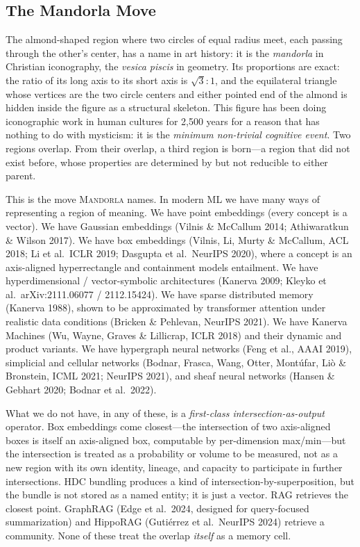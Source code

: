 \documentclass[11pt,a4paper]{article}
\begin{document}
\subsection{The Mandorla Move}

The almond-shaped region where two circles of equal radius meet, each passing through the other's center, has a name in art history: it is the \emph{mandorla} in Christian iconography, the \emph{vesica piscis} in geometry. Its proportions are exact: the ratio of its long axis to its short axis is $\sqrt{3}:1$, and the equilateral triangle whose vertices are the two circle centers and either pointed end of the almond is hidden inside the figure as a structural skeleton. This figure has been doing iconographic work in human cultures for 2,500 years for a reason that has nothing to do with mysticism: it is the \emph{minimum non-trivial cognitive event}. Two regions overlap. From their overlap, a third region is born---a region that did not exist before, whose properties are determined by but not reducible to either parent.

This is the move \textsc{Mandorla} names. In modern ML we have many ways of representing a region of meaning. We have point embeddings (every concept is a vector). We have Gaussian embeddings (Vilnis \& McCallum 2014; Athiwaratkun \& Wilson 2017). We have box embeddings (Vilnis, Li, Murty \& McCallum, ACL 2018; Li et al.\ ICLR 2019; Dasgupta et al.\ NeurIPS 2020), where a concept is an axis-aligned hyperrectangle and containment models entailment. We have hyperdimensional / vector-symbolic architectures (Kanerva 2009; Kleyko et al.\ arXiv:2111.06077 / 2112.15424). We have sparse distributed memory (Kanerva 1988), shown to be approximated by transformer attention under realistic data conditions (Bricken \& Pehlevan, NeurIPS 2021). We have Kanerva Machines (Wu, Wayne, Graves \& Lillicrap, ICLR 2018) and their dynamic and product variants. We have hypergraph neural networks (Feng et al., AAAI 2019), simplicial and cellular networks (Bodnar, Frasca, Wang, Otter, Mont\'ufar, Li\`o \& Bronstein, ICML 2021; NeurIPS 2021), and sheaf neural networks (Hansen \& Gebhart 2020; Bodnar et al.\ 2022).

What we do not have, in any of these, is a \emph{first-class intersection-as-output} operator. Box embeddings come closest---the intersection of two axis-aligned boxes is itself an axis-aligned box, computable by per-dimension max/min---but the intersection is treated as a probability or volume to be measured, not as a new region with its own identity, lineage, and capacity to participate in further intersections. HDC bundling produces a kind of intersection-by-superposition, but the bundle is not stored as a named entity; it is just a vector. RAG retrieves the closest point. GraphRAG (Edge et al.\ 2024, designed for query-focused summarization) and HippoRAG (Guti\'errez et al.\ NeurIPS 2024) retrieve a community. None of these treat the overlap \emph{itself} as a memory cell.
\end{document}
